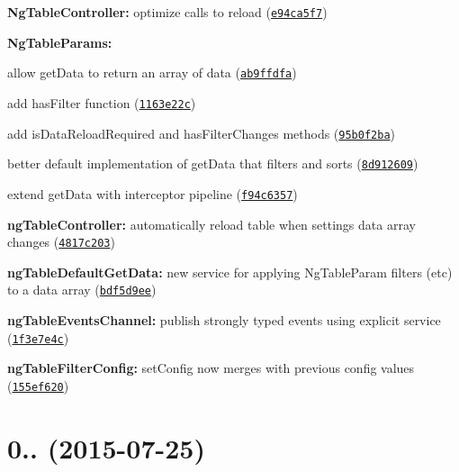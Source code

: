 \begin{DoxyItemize}
\item {\bfseries Ng\+Table\+Controller\+:} optimize calls to reload (\href{https://github.com/esvit/ng-table/commit/e94ca5f7873673616e15a46ab8317595331ab6e1}{\tt e94ca5f7})
\item {\bfseries Ng\+Table\+Params\+:}
\begin{DoxyItemize}
\item allow get\+Data to return an array of data (\href{https://github.com/esvit/ng-table/commit/ab9ffdfa09c64a10b4f955db21ed4de0a0bf7a9d}{\tt ab9ffdfa})
\item add has\+Filter function (\href{https://github.com/esvit/ng-table/commit/1163e22c9115515f3e9854769aa179895edfa550}{\tt 1163e22c})
\item add is\+Data\+Reload\+Required and has\+Filter\+Changes methods (\href{https://github.com/esvit/ng-table/commit/95b0f2ba9e5073b5866c7c332c9556debe76495c}{\tt 95b0f2ba})
\item better default implementation of get\+Data that filters and sorts (\href{https://github.com/esvit/ng-table/commit/8d912609f156d3722bba79ea53d5232576282ae8}{\tt 8d912609})
\item extend get\+Data with interceptor pipeline (\href{https://github.com/esvit/ng-table/commit/f94c63572782b2e8a808beaf0c58a463e3fe50a4}{\tt f94c6357})
\end{DoxyItemize}
\item {\bfseries ng\+Table\+Controller\+:} automatically reload table when settings data array changes (\href{https://github.com/esvit/ng-table/commit/4817c20359ee571c73e0edba89bf759a4f3b5aa2}{\tt 4817c203})
\item {\bfseries ng\+Table\+Default\+Get\+Data\+:} new service for applying Ng\+Table\+Param filters (etc) to a data array (\href{https://github.com/esvit/ng-table/commit/bdf5d9ee3a71a441aba667d12bc5e48153fe32dc}{\tt bdf5d9ee})
\item {\bfseries ng\+Table\+Events\+Channel\+:} publish strongly typed events using explicit service (\href{https://github.com/esvit/ng-table/commit/1f3e7e4cd797d6b96bb57473786eea64f805ce81}{\tt 1f3e7e4c})
\item {\bfseries ng\+Table\+Filter\+Config\+:} set\+Config now merges with previous config values (\href{https://github.com/esvit/ng-table/commit/155ef6203baf228976d201e6757adf69a669d5c0}{\tt 155ef620})
\end{DoxyItemize}

\label{_0.8.0}%
 \section*{0.. (2015-\/07-\/25)}

